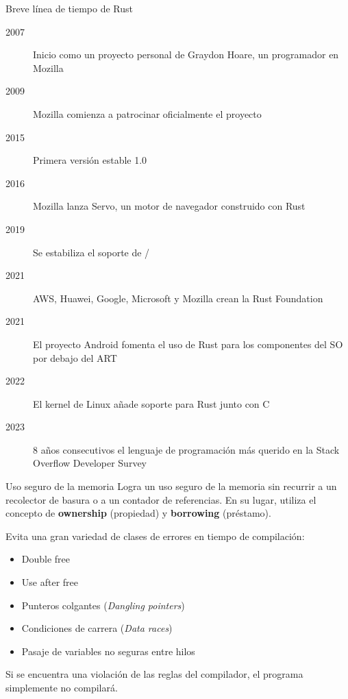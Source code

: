 \documentclass{beamer}
\begin{document}
\begin{frame}{Breve línea de tiempo de Rust}
  \begin{description}
    \item [2007] Inicio como un proyecto personal de Graydon Hoare, un programador en Mozilla
    \item [2009] Mozilla comienza a patrocinar oficialmente el proyecto
    \item [2015] Primera versión estable 1.0
    \item [2016] Mozilla lanza Servo, un motor de navegador construido con Rust
    \item [2019] Se estabiliza el soporte de /
    \item [2021] AWS, Huawei, Google, Microsoft y Mozilla crean la Rust Foundation
    \item [2021] El proyecto Android fomenta el uso de Rust para los componentes del SO por debajo del ART
    \item [2022] El kernel de Linux añade soporte para Rust junto con C
    \item [2023] 8 años consecutivos el lenguaje de programación más querido en la Stack Overflow Developer Survey
  \end{description}
\end{frame}

\begin{frame}{Uso seguro de la memoria}
  Logra un uso seguro de la memoria sin recurrir a un recolector de basura o a un contador de referencias.
  En su lugar, utiliza el concepto de \textbf{ownership} (propiedad) y \textbf{borrowing} (préstamo).

  \vfill

  Evita una gran variedad de clases de errores en tiempo de compilación:

  \begin{itemize}
    \item Double free
    \item Use after free
    \item Punteros colgantes (\emph{Dangling pointers})
    \item Condiciones de carrera (\emph{Data races})
    \item Pasaje de variables no seguras entre hilos
  \end{itemize}

  \vfill

  Si se encuentra una violación de las reglas del compilador, el programa simplemente no compilará.
\end{frame}
\end{document}
